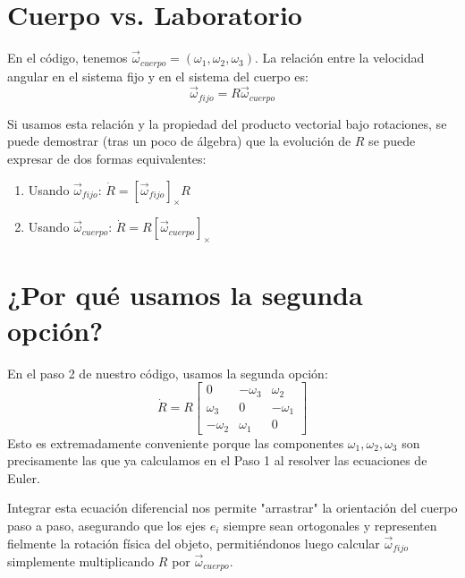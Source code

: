 \documentclass[12pt]{article}
\begin{document}
\section{Cuerpo vs. Laboratorio}
En el código, tenemos $\vec{\omega}_{cuerpo} = (\omega_1, \omega_2, \omega_3)$. La relación entre la velocidad angular en el sistema fijo y en el sistema del cuerpo es:
\begin{equation}
    \vec{\omega}_{fijo} = R \vec{\omega}_{cuerpo}
\end{equation}

Si usamos esta relación y la propiedad del producto vectorial bajo rotaciones, se puede demostrar (tras un poco de álgebra) que la evolución de $R$ se puede expresar de dos formas equivalentes:
\begin{enumerate}
    \item Usando $\vec{\omega}_{fijo}$: $\dot{R} = [\vec{\omega}_{fijo}]_\times R$
    \item Usando $\vec{\omega}_{cuerpo}$: $\dot{R} = R [\vec{\omega}_{cuerpo}]_\times$
\end{enumerate}

\section{¿Por qué usamos la segunda opción?}
En el paso 2 de nuestro código, usamos la segunda opción:
\begin{equation}
    \dot{R} = R \begin{bmatrix} 0 & -\omega_3 & \omega_2 \\ \omega_3 & 0 & -\omega_1 \\ -\omega_2 & \omega_1 & 0 \end{bmatrix}
\end{equation}
Esto es extremadamente conveniente porque las componentes $\omega_1, \omega_2, \omega_3$ son precisamente las que ya calculamos en el Paso 1 al resolver las ecuaciones de Euler. 

Integrar esta ecuación diferencial nos permite "arrastrar" la orientación del cuerpo paso a paso, asegurando que los ejes $\hat{e}_i$ siempre sean ortogonales y representen fielmente la rotación física del objeto, permitiéndonos luego calcular $\vec{\omega}_{fijo}$ simplemente multiplicando $R$ por $\vec{\omega}_{cuerpo}$.
\end{document}
